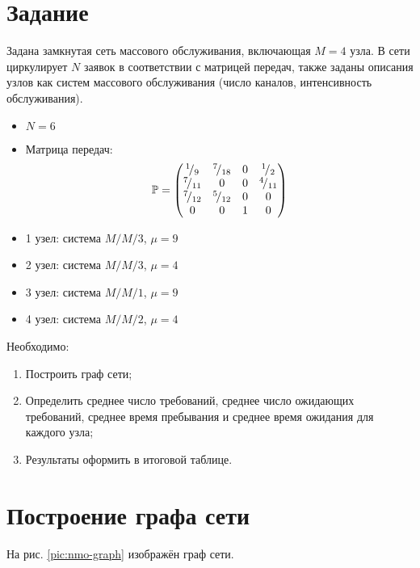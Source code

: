 





\section{Задание}

Задана замкнутая сеть массового обслуживания, включающая $M = 4$ узла. В сети циркулирует $N$ заявок в соответствии с матрицей передач, также заданы описания узлов как систем массового обслуживания (число каналов, интенсивность обслуживания). 

\begin{itemize}
	\item $N = 6$
	\item Матрица передач:
	\begin{equation*}
		\mathbb{P} = \begin{pmatrix}
			{}^{1}\!/_{9} & {}^{7}\!/_{18} & 0 & {}^{1}\!/_{2} \\
			{}^{7}\!/_{11} & 0 & 0 & {}^{4}\!/_{11} \\
			{}^{7}\!/_{12} & {}^{5}\!/_{12} & 0 & 0 \\
			0 & 0 & 1 & 0
		\end{pmatrix}
	\end{equation*}
	\item 1 узел: система $M/M/3$, $\mu = 9$
	\item 2 узел: система $M/M/3$, $\mu = 4$
	\item 3 узел: система $M/M/1$, $\mu = 9$
	\item 4 узел: система $M/M/2$, $\mu = 4$
\end{itemize}

Необходимо:
\begin{enumerate}
	\item Построить граф сети;
	\item Определить среднее число требований, среднее число ожидающих требований, среднее время пребывания и среднее время ожидания для каждого узла;
	\item Результаты оформить в итоговой таблице.
\end{enumerate}

\section{Построение графа сети}

На рис. \ref{pic:nmo-graph} изображён граф сети.

